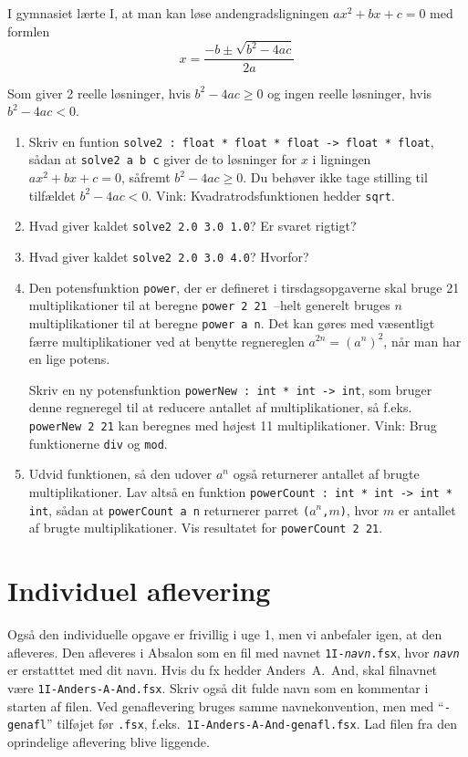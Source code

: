 \documentclass[a4paper,12pt]{article}
\begin{document}
I gymnasiet lærte I, at man kan løse andengradsligningen $ax^2 + bx +
c = 0$ med formlen
\[x = \frac{-b \pm \sqrt{b^2 - 4ac}}{2a}\]

Som giver 2 reelle løsninger, hvis $b^2 - 4ac \ge 0$ og ingen reelle
løsninger, hvis $b^2 - 4ac < 0$.

\begin{enumerate}[{1}G1]
\item Skriv en funtion %
  \verb|solve2 : float * float * float -> float * float|, sådan at\newline
  \verb|solve2 a b c| giver de to løsninger for $x$ i
  ligningen $ax^2 + bx + c = 0$, såfremt $b^2 - 4ac \ge 0$. Du behøver
  ikke tage stilling til tilfældet $b^2 - 4ac < 0$.  Vink:
  Kvadratrodsfunktionen hedder \verb|sqrt|.
\item Hvad giver kaldet \verb|solve2 2.0 3.0 1.0|? Er svaret rigtigt?
\item Hvad giver kaldet \verb|solve2 2.0 3.0 4.0|? Hvorfor?

\item Den potensfunktion \verb|power|, der er defineret i tirsdagsopgaverne
skal bruge 21 multiplikationer til at beregne \verb|power 2 21 |--helt
generelt bruges $n$ multiplikationer til at beregne
\verb|power a n|. Det kan gøres med væsentligt færre
multiplikationer ved at benytte regnereglen $a^{2n} = (a^n)^2$, når
man har en lige potens.

Skriv en ny potensfunktion \verb|powerNew : int * int -> int|, som
bruger denne regneregel til at reducere antallet af multiplikationer,
så f.eks. \verb|powerNew 2 21| kan beregnes med højest 11
multiplikationer. Vink: Brug funktionerne \verb|div| og \verb|mod|.

\item Udvid funktionen, så den udover $a^n$ også returnerer antallet
  af brugte multiplikationer. Lav altså en funktion %
  \verb|powerCount : int * int -> int * int|, sådan at
  \verb|powerCount a n| returnerer parret \texttt{($a^n$,$m$)},
  hvor $m$ er antallet af brugte multiplikationer. Vis resultatet for
  \verb|powerCount 2 21|.
\end{enumerate}

\section{Individuel aflevering}
\label{sec:indiv-aflev}

Også den individuelle opgave er frivillig i uge 1, men vi anbefaler
igen, at den afleveres. Den afleveres i Absalon som en fil med navnet
\texttt{1I-\textit{navn}.fsx}, hvor \texttt{\textit{navn}} er
erstatttet med dit navn. Hvis du fx hedder Anders~A.~And, skal
filnavnet være \texttt{1I-Anders-A-And.fsx}. Skriv også dit fulde navn
som en kommentar i starten af filen.  Ved genaflevering bruges samme
navnekonvention, men med ``\texttt{-genafl}'' tilføjet før
\texttt{.fsx}, f.eks.\ \texttt{1I-Anders-A-And-genafl.fsx}.  Lad filen
fra den oprindelige aflevering blive liggende.
\end{document}
